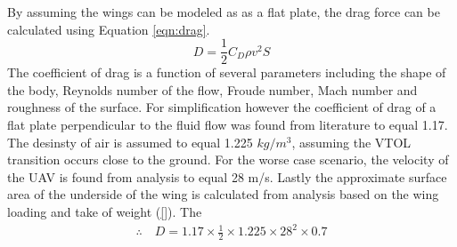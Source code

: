 By assuming the wings can be modeled as as a flat plate, the drag force can be calculated using Equation \ref{eqn:drag}.
\begin{equation}
    D=\frac{1}{2}C_D\rho v^2S \label{eqn:drag}
\end{equation}
The coefficient of drag is a function of several parameters including the shape of the body, Reynolds number of the flow, Froude number, Mach number and roughness of the surface. For simplification however the coefficient of drag of a flat plate perpendicular to the fluid flow was found from literature to equal 1.17. The desinsty of air is assumed to equal 1.225 \(kg/m^3\), assuming the VTOL transition occurs close to the ground. For the worse case scenario, the velocity of the UAV is found from analysis to equal 28 m/s. Lastly the approximate surface area of the underside of the wing is calculated from analysis based on the wing loading and take of weight (\ref{}). The   
\begin{gather*}
    \therefore\quad D=1.17\times \frac{1}{2}\times 1.225\times 28^2\times 0.7
\end{gather*}

